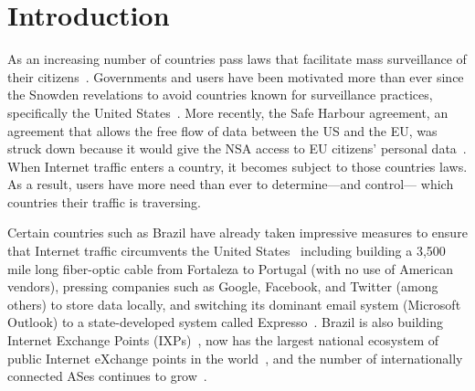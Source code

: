 \section{Introduction}
\label{intro}


As an increasing number of countries pass laws that facilitate mass
surveillance of their citizens~\cite{france_surveillance,
  netherlands_surveillance, kazak_surveillance, uk_bill}.  Governments
and users have been motivated more than ever since the Snowden
revelations to avoid countries known for surveillance practices,
specifically the United States~\cite{russia_secure_internet,
  routing_errors, dte}.  More recently, the Safe Harbour agreement, an
agreement that allows the free flow of data between the US and the EU,
was struck down because it would give the NSA access to EU citizens'
personal data~\cite{safe_harbour_illegal, safe_harbour_undecided}.  When
Internet traffic enters a country, it becomes subject to those countries
laws.  As a result, users have more need than ever to determine---and
control--- which countries their traffic is traversing.

Certain countries such as Brazil have already taken impressive measures
to ensure that Internet traffic circumvents the United
States~\cite{brazil_history, brazil_break_from_US, brazil_conference,
  brazil_conference2, brazil_human_rights} including building a 3,500
mile long fiber-optic cable from Fortaleza to Portugal (with no use of
American vendors), pressing companies such as Google, Facebook, and
Twitter (among others) to store data locally, and switching its dominant
email system (Microsoft Outlook) to a state-developed system called
Expresso~\cite{brazil_cable, brazil_us_companies}.  Brazil is also
building Internet Exchange Points (IXPs)~\cite{brazil_IXP1}, now has the
largest national ecosystem of public Internet eXchange points in the
world~\cite{brazil_ixp_ecosystem}, and the number of internationally
connected ASes continues to grow~\cite{brazil_international_ases}.  

